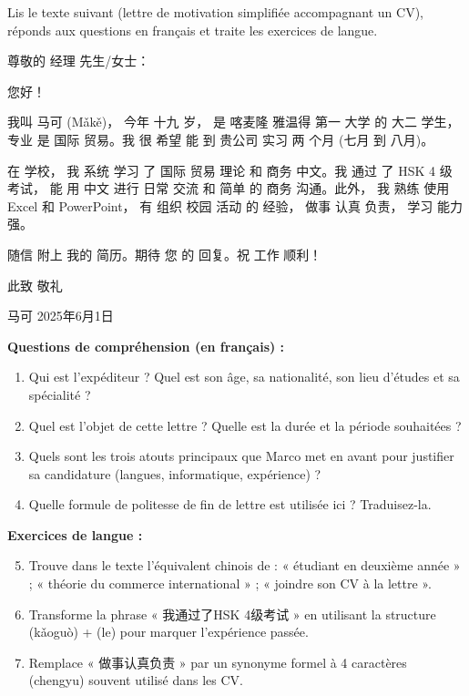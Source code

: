 \documentclass[11pt]{article}
\newcounter{popsec}
\newcounter{popsub}
\newcommand{\courssub}[1]{%
  \stepcounter{popsub}%
  \par\vspace{9pt}\noindent{\popxbold\fontsize{11.5}{13}\selectfont\color{popink}{\color{poporange}\thepopsec.\thepopsub}\hspace{6pt}#1}\par\nopagebreak\vspace{4pt}
}
\newcommand{\zh}[1]{\ifmmode\text{#1}\else{#1}\fi}
\begin{document}
\courssub{Je me prépare au Bac}

\begin{exercice}
Lis le texte suivant (lettre de motivation simplifiée accompagnant un CV), réponds aux questions en français et traite les exercices de langue.
\begin{textebox}
尊敬的 经理 先生/女士：

您好！

我叫 马可 (Mǎkě)， 今年 十九 岁， 是 喀麦隆 雅温得 第一 大学 的 大二 学生， 专业 是 国际 贸易。我 很 希望 能 到 贵公司 实习 两 个月 (七月 到 八月)。

在 学校， 我 系统 学习 了 国际 贸易 理论 和 商务 中文。我 通过 了 HSK 4 级 考试， 能 用 中文 进行 日常 交流 和 简单 的 商务 沟通。此外， 我 熟练 使用 Excel 和 PowerPoint， 有 组织 校园 活动 的 经验， 做事 认真 负责， 学习 能力 强。

随信 附上 我的 简历。期待 您 的 回复。祝 工作 顺利！

此致
敬礼

马可
2025年6月1日
\end{textebox}

\textbf{Questions de compréhension (en français) :}
\begin{enumerate}
    \item Qui est l'expéditeur ? Quel est son âge, sa nationalité, son lieu d'études et sa spécialité ?
    \item Quel est l'objet de cette lettre ? Quelle est la durée et la période souhaitées ?
    \item Quels sont les trois atouts principaux que Marco met en avant pour justifier sa candidature (langues, informatique, expérience) ?
    \item Quelle formule de politesse de fin de lettre est utilisée ici ? Traduisez-la.
\end{enumerate}

\textbf{Exercices de langue :}
\begin{enumerate}
    \setcounter{enumi}{4}
    \item Trouve dans le texte l'équivalent chinois de : « étudiant en deuxième année » ; « théorie du commerce international » ; « joindre son CV à la lettre ».
    \item Transforme la phrase « 我通过了HSK 4级考试 » en utilisant la structure \zh{考过} (kǎoguò) + \zh{了} (le) pour marquer l'expérience passée.
    \item Remplace « 做事认真负责 » par un synonyme formel à 4 caractères (chengyu) souvent utilisé dans les CV.
\end{enumerate}
\end{exercice}
\end{document}
